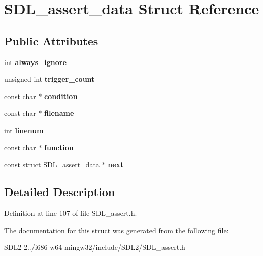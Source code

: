\hypertarget{structSDL__assert__data}{\section{S\+D\+L\+\_\+assert\+\_\+data Struct Reference}
\label{structSDL__assert__data}
}
\subsection*{Public Attributes}
\begin{DoxyCompactItemize}
\item 
\hypertarget{structSDL__assert__data_ac8997040e60dd538facd3604f0498dd4}{int {\bfseries always\+\_\+ignore}}\label{structSDL__assert__data_ac8997040e60dd538facd3604f0498dd4}

\item 
\hypertarget{structSDL__assert__data_ac3e02d5e1ed06d11f7e49b6d652655d6}{unsigned int {\bfseries trigger\+\_\+count}}\label{structSDL__assert__data_ac3e02d5e1ed06d11f7e49b6d652655d6}

\item 
\hypertarget{structSDL__assert__data_acb5f8a51d55c25fdd02d7e4243715e61}{const char $\ast$ {\bfseries condition}}\label{structSDL__assert__data_acb5f8a51d55c25fdd02d7e4243715e61}

\item 
\hypertarget{structSDL__assert__data_abe81ae55742f72104c577a5cd8fa9609}{const char $\ast$ {\bfseries filename}}\label{structSDL__assert__data_abe81ae55742f72104c577a5cd8fa9609}

\item 
\hypertarget{structSDL__assert__data_aec495b21ff71db1226eff0e6d5db333a}{int {\bfseries linenum}}\label{structSDL__assert__data_aec495b21ff71db1226eff0e6d5db333a}

\item 
\hypertarget{structSDL__assert__data_adbd755a85652916f443cbad0647de378}{const char $\ast$ {\bfseries function}}\label{structSDL__assert__data_adbd755a85652916f443cbad0647de378}

\item 
\hypertarget{structSDL__assert__data_a81b9305d349f042ceb9083a3e8c70ccc}{const struct \hyperlink{structSDL__assert__data}{S\+D\+L\+\_\+assert\+\_\+data} $\ast$ {\bfseries next}}\label{structSDL__assert__data_a81b9305d349f042ceb9083a3e8c70ccc}

\end{DoxyCompactItemize}


\subsection{Detailed Description}


Definition at line 107 of file S\+D\+L\+\_\+assert.\+h.



The documentation for this struct was generated from the following file\+:\begin{DoxyCompactItemize}
\item 
S\+D\+L2-\/2../i686-\/w64-\/mingw32/include/\+S\+D\+L2/S\+D\+L\+\_\+assert.\+h\end{DoxyCompactItemize}

